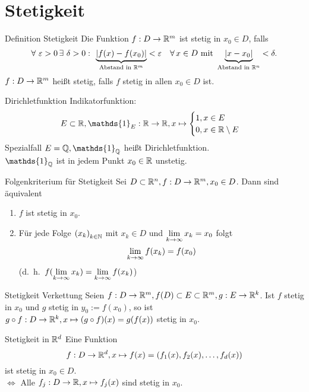 \documentclass[main.tex]{subfiles}
\begin{document}
\section*{Stetigkeit}
\begin{karte}{Definition Stetigkeit}
    Die Funktion \( f: D\rightarrow \mathbb{R}^m \) ist stetig 
    in \( x_0 \in D \), falls
    \[ \forall \, \varepsilon > 0 \,\exists \, \delta > 0 
    \, \colon \, \underbrace{ \abs{ f(x) - f(x_0) 
    }}_{\text{Abstand in } \R^m} < \varepsilon \quad 
    \forall x\in D \text{ mit } \underbrace{\abs{x - x_0} 
    }_{\text{Abstand in } \R^n} < \delta. \]
    \( f: D\rightarrow \mathbb{R}^m \) heißt stetig, falls \( f \) 
    stetig in allen \(x_0 \in D \) ist.
\end{karte}
\begin{karte}{Dirichletfunktion}
    Indikatorfunktion:
    \[ E\subset \R, 
        \mathds{1}_E : \R\rightarrow\R, x\mapsto 
        \begin{cases}
        1, x\in E\\
        0, x\in\R \setminus E
    \end{cases} \]
    Spezialfall \( E = \Q, \mathds{1}_\Q \) heißt Dirichletfunktion.\\
    \( \mathds{1}_\Q \) ist in jedem Punkt \( x_0 \in \mathbb{R} \) unstetig.
\end{karte}
\begin{karte}{Folgenkriterium für Stetigkeit}
    Sei \( D\subset \mathbb{R}^n, f:D\rightarrow \mathbb{R}^m, x_0 \in D \). Dann sind
    äquivalent
    \begin{enumerate}
        \item \( f \) ist stetig in \( x_0 \).
        \item Für jede Folge \( {(x_k)}_{k\in\mathbb{N}} \) mit \( x_k \in D \)
        und \( \lim\limits_{k\rightarrow\infty} x_k = x_0 \) folgt 
        \[ \lim\limits_{k\rightarrow\infty} f(x_k) = f(x_0) \]
        (d.\ h.\  \( f(\lim\limits_{k\rightarrow\infty} x_k) = \lim\limits_{k\rightarrow\infty} f(x_k) \))
    \end{enumerate}
\end{karte}
\begin{karte}{Stetigkeit Verkettung}
    Seien \( f:D\rightarrow \mathbb{R}^m, f(D) \subset E \subset \mathbb{R}^m, 
    g: E\rightarrow\mathbb{R}^k \). Ist \( f \) stetig in \( x_0 \)
    und \( g \) stetig in \( y_0 := f(x_0) \), so ist 
    \( g \circ f : D\rightarrow \mathbb{R}^k, x \mapsto (g\circ f)(x) 
    = g(f(x)) \) stetig in \( x_0 \).
\end{karte}
\begin{karte}{Stetigkeit in \( \mathbb{R}^d \)}
    Eine Funktion \[ f: D\rightarrow \mathbb{R}^d, x\mapsto 
    f(x) = (f_1(x), f_2(x), \dots , f_d(x)) \]
    ist stetig in  \(x_0 \in D\).\\
    \( \Leftrightarrow \) Alle  
    \( f_j : D \rightarrow \mathbb{R}, x\mapsto f_j(x) \) 
    sind stetig in \( x_0 \).
\end{karte}
\end{document}
